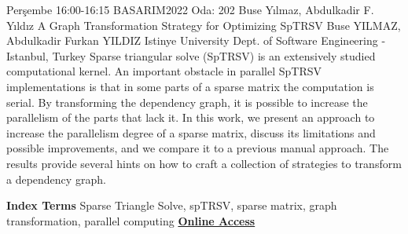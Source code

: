 
    \begin{abstract_basarim}
    {Perşembe 16:00-16:15}
    {BASARIM2022}
    {Oda: 202}
    {Buse Yılmaz, Abdulkadir F. Yıldız}
    {A Graph Transformation Strategy for Optimizing SpTRSV}
    {%
    Buse YILMAZ, Abdulkadir Furkan YILDIZ}
    {%
    }
    {%
    Istinye University Dept. of Software Engineering - Istanbul, Turkey}
    Sparse triangular solve (SpTRSV) is an extensively studied computational kernel. An important obstacle in parallel SpTRSV implementations is that in some parts of a sparse matrix the computation is serial. By transforming the dependency graph, it is possible to increase the parallelism of the parts that lack it. In this work, we present an approach to increase the parallelism degree of a sparse matrix, discuss its limitations and possible improvements, and we compare it to a previous manual approach. The results provide several hints on how to craft a collection of strategies to transform a dependency graph. 
    
            \textbf{Index Terms} \newline{}Sparse Triangle Solve, spTRSV, sparse matrix, graph transformation, parallel computing
     \newline\newline\noindent \href{https://drive.google.com/file/d/1HMZ0HP05iNL0czsleGZIRxPvC3phoseg/view?usp=drivesdk}{\bfseries Online Access}
    \end{abstract_basarim}
    